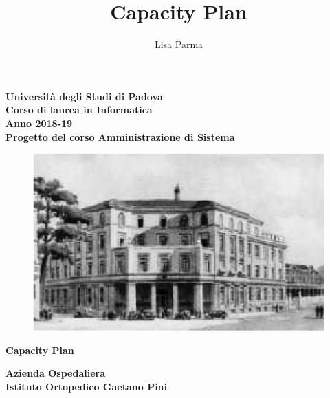 \documentclass[a4paper, oneside, openany,12pt]{article}
\title{\textbf{Capacity Plan}}
\author{Lisa Parma}
\begin{document}
	
\begin{titlepage}
	\begin{center}
	
		\textbf{Università degli Studi di Padova \\ Corso di laurea in Informatica \\ Anno 2018-19 \\}
		\textbf{Progetto del corso Amministrazione di Sistema}
		\vspace{1cm}
		\begin{center}
			\begin{figure}[h!]
				\centering
				\includegraphics[width=0.5\linewidth]{./img/logo.jpg}
			\end{figure}
			\begin{Huge}
				\textbf{Capacity Plan} \\
			\end{Huge}
			\begin{Large}
				\textbf{Azienda Ospedaliera} \\
				\textbf{Istituto Ortopedico Gaetano Pini} \\
			\end{Large}
		
	\end{center}
	\end{center}
\end{titlepage}

\tableofcontents
{}
{}
\listoftables

\end{document}
